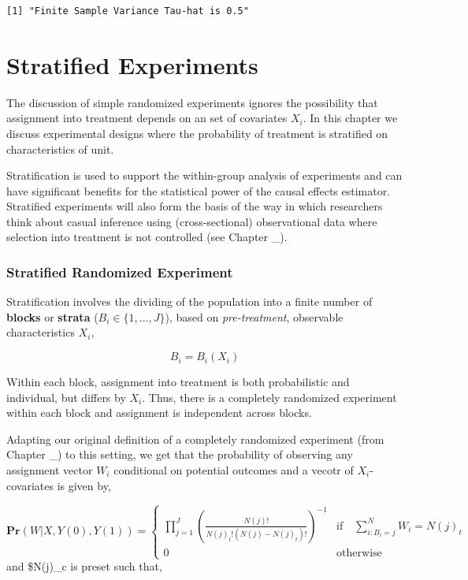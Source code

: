 \documentclass[
  letterpaper,
  DIV=11,
  numbers=noendperiod]{scrreprt}
\theoremstyle{definition}
\theoremstyle{remark}
\begin{document}
\begin{verbatim}
[1] "Finite Sample Variance Tau-hat is 0.5"
\end{verbatim}

\chapter{Stratified Experiments}\label{sec-stratified}

The discussion of simple randomized experiments ignores the possibility
that assignment into treatment depends on an set of covariates \(X_i\).
In this chapter we discuss experimental designs where the probability of
treatment is stratified on characteristics of unit.

Stratification is used to support the within-group analysis of
experiments and can have significant benefits for the statistical power
of the causal effects estimator. Stratified experiments will also form
the basis of the way in which researchers think about casual inference
using (cross-sectional) observational data where selection into
treatment is not controlled (see Chapter \_).

\subsection{Stratified Randomized
Experiment}\label{stratified-randomized-experiment}

Stratification involves the dividing of the population into a finite
number of \textbf{blocks} or \textbf{strata} (\(B_i \in \{1,...,J\}\)),
based on \emph{pre-treatment}, observable characteristics \(X_i\),

\[
B_i = B_i(X_i)
\]

Within each block, assignment into treatment is both probabilistic and
individual, but differs by \(X_i\). Thus, there is a completely
randomized experiment within each block and assignment is independent
across blocks.

Adapting our original definition of a completely randomized experiment
(from Chapter \_) to this setting, we get that the probability of
observing any assignment vector \(W_i\) conditional on potential
outcomes and a vecotr of \(X_i\)-covariates is given by,

\[
\mathbf{Pr}(W|X,Y(0),Y(1))=
\begin{cases}
\prod^J_{j=1} (\frac{N(j)!}{N(j)_t!(N(j)-N(j)_t)!})^{-1} & \text{if} \quad \sum^N_{i:B_i=j} W_i=N(j)_t \\
                    0 &\text{otherwise}
\end{cases}
\] and \$N(j)\_c is preset such that,
\end{document}
